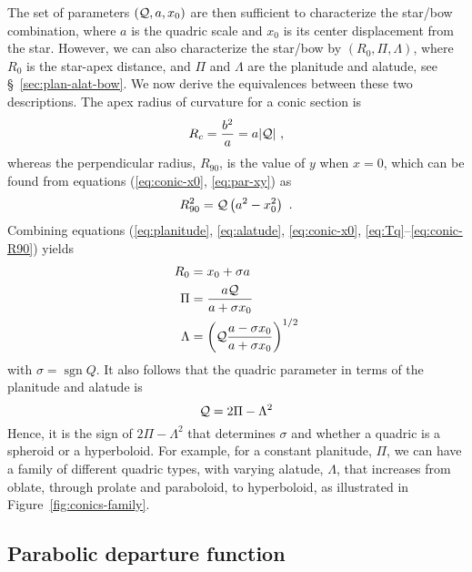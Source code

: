 \documentclass[useAMS, usenatbib, a4paper]{mnras}
\DeclareMathOperator{\sgn}{sgn}
\providecommand{\abs}[1]{\lvert#1\rvert}
\begin{document}
The set of parameters \((\mathcal{Q}, a, x_0)\) are then sufficient to
characterize the star/bow combination, where \(a\) is the quadric
scale and \(x_0\) is its center displacement from the star.  However,
we can also characterize the star/bow by \((R_0, \Pi, \Lambda)\), where
\(R_0\) is the star-apex distance, and \(\Pi\) and \(\Lambda\) are the
planitude and alatude, see \S~\ref{sec:plan-alat-bow}.  We now derive
the equivalences between these two descriptions.  The apex radius of
curvature for a conic section is
\begin{equation}
  \label{eq:Rc-conic}
  R_c = \frac{b^2}{a} = a \abs{\Q}\ ,
\end{equation}
whereas the perpendicular radius, \(R_{90}\), is the value of \(y\)
when \(x = 0\), which can be found from equations (\ref{eq:conic-x0},
\ref{eq:par-xy}) as
\begin{equation}
  \label{eq:conic-R90}
  R_{90}^2 = \mathcal{Q} \left(a^2 - x_0^2\right) \ .
\end{equation}
Combining equations (\ref{eq:planitude}, \ref{eq:alatude},
\ref{eq:conic-x0}, \ref{eq:Tq}--\ref{eq:conic-R90}) yields
\begin{align}
  \label{eq:R0-from-Q-a-x0}
  R_0 &= x_0 + \sigma a  \\
  \label{eq:Pi-from-Q-a-x0}
  \Pi &= \frac{a \mathcal{Q}}{a + \sigma x_0} \\
  \label{eq:Lambda-from-Q-a-x0}
  \Lambda &= \left( \mathcal{Q} \frac{a - \sigma x_0} {a + \sigma x_0}  \right)^{1/2}
\end{align}
with \(\sigma = \sgn Q\).  It also follows that the quadric parameter in
terms of the planitude and alatude is
\begin{equation}
  \label{eq:Tq-from-Pi-Lambda}
  \mathcal{Q} = 2 \Pi - \Lambda^2 
\end{equation}
Hence, it is the sign of \(2 \Pi - \Lambda^2\) that determines
\(\sigma\) and whether a quadric is a spheroid or a hyperboloid.  For
example, for a constant planitude, \(\Pi\), we can have a family of
different quadric types, with varying alatude, \(\Lambda\), that increases
from oblate, through prolate and paraboloid, to hyperboloid, as
illustrated in Figure~\ref{fig:conics-family}.


\subsection{Parabolic departure function}
\label{sec:parab-depart-funct}
\end{document}
